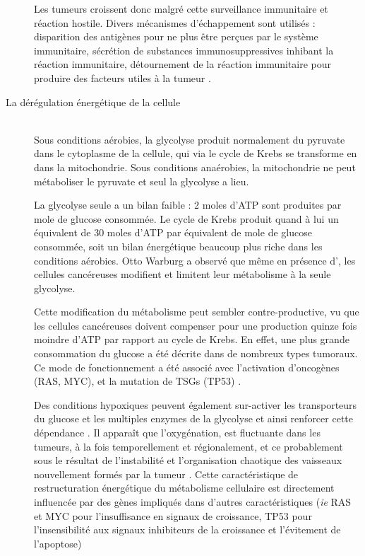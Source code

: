 \begin{description}
					Les tumeurs croissent donc malgré cette surveillance immunitaire et réaction hostile.
					Divers mécanismes d'échappement sont utilisés : disparition des antigènes pour ne plus être perçues par le système immunitaire, sécrétion de substances immunosuppressives inhibant la réaction immunitaire, détournement de la réaction immunitaire pour produire des facteurs utiles à la tumeur \citep{Manjili2012}.

				\item [La dérégulation énergétique de la cellule]               \hfill \\
					Sous conditions aérobies, la glycolyse produit normalement du pyruvate dans le cytoplasme de la cellule, qui via le cycle de Krebs se transforme en {\COO} dans la mitochondrie.
					Sous conditions anaérobies, la mitochondrie ne peut métaboliser le pyruvate et seul la glycolyse a lieu.

					La glycolyse seule a un bilan faible : 2 moles d'\acs{ATP} sont produites par mole de glucose consommée.
					Le cycle de Krebs produit quand à lui un équivalent de 30 moles d'\acs{ATP} par équivalent de mole de glucose consommée, soit un bilan énergétique beaucoup plus riche dans les conditions aérobies.
					Otto Warburg a observé que même en présence d'{\OO}, les cellules cancéreuses modifient et limitent leur métabolisme à la seule glycolyse.

					Cette modification du métabolisme peut sembler contre-productive, vu que les cellules cancéreuses doivent compenser pour une production quinze fois moindre d'\acs{ATP} par rapport au cycle de Krebs.
					En effet, une plus grande consommation du glucose a été décrite dans de nombreux types tumoraux.
					Ce mode de fonctionnement a été associé avec l'activation d'oncogènes (\acs{RAS}, \acs{MYC}), et la mutation de \acsp{TSG} (\acs{TP53}) \citep{Deberardinis2008}.

					Des conditions hypoxiques peuvent également sur-activer les transporteurs du glucose et les multiples enzymes de la glycolyse et ainsi renforcer cette dépendance \citep{Deberardinis2008}.
					Il apparaît que l'oxygénation, est fluctuante dans les tumeurs, à la fois temporellement et régionalement, et ce probablement sous le résultat de l'instabilité et l'organisation chaotique des vaisseaux nouvellement formés par la tumeur \citep{Hardee2009}.
					Cette caractéristique de restructuration énergétique du métabolisme cellulaire est directement influencée par des gènes impliqués dans d'autres caractéristiques (\emph{ie} \acs{RAS} et \acs{MYC} pour l'insuffisance en signaux de croissance, \acs{TP53} pour l'insensibilité aux signaux inhibiteurs de la croissance et l'évitement de l'apoptose)
			\end{description}
			\vspace{1.5ex}

